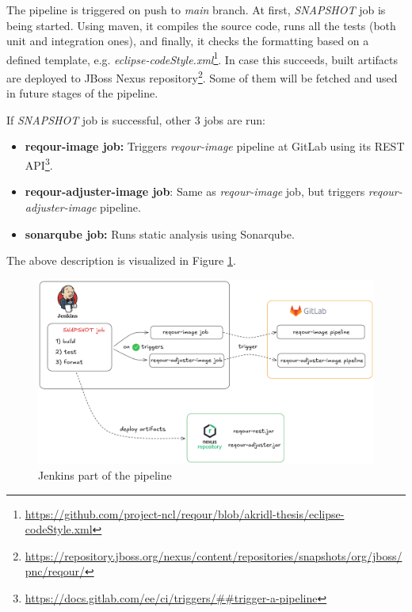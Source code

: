 \documentclass[../main.tex]{subfiles}
\begin{document}
The pipeline is triggered on push to \textit{main} branch. At first, \textit{SNAPSHOT} job is being started. Using maven, it compiles the source code, runs all the tests (both unit and integration ones), and finally, it checks the formatting based on a defined template, e.g. \textit{eclipse-codeStyle.xml}\footnote{\url{https://github.com/project-ncl/reqour/blob/akridl-thesis/eclipse-codeStyle.xml}}. In case this succeeds, built artifacts are deployed to JBoss Nexus repository\footnote{\url{https://repository.jboss.org/nexus/content/repositories/snapshots/org/jboss/pnc/reqour/}}. Some of them will be fetched and used in future stages of the pipeline.

If \textit{SNAPSHOT} job is successful, other 3 jobs are run:
\begin{itemize}
    \item \textbf{reqour-image job:} Triggers \textit{reqour-image} pipeline at GitLab using its REST API\footnote{\url{https://docs.gitlab.com/ee/ci/triggers/##trigger-a-pipeline}}.

    \item \textbf{reqour-adjuster-image job}: Same as \textit{reqour-image} job, but triggers \textit{reqour-adjuster-image} pipeline.

    \item \textbf{sonarqube job:} Runs static analysis using Sonarqube.
\end{itemize}

The above description is visualized in Figure \ref{fig:jenkins}.

\begin{figure}
  \begin{center}
    \includegraphics[width=\textwidth]{images/jenkins.png}
  \end{center}
  \caption{Jenkins part of the pipeline}
  \label{fig:jenkins}
\end{figure}
\end{document}
